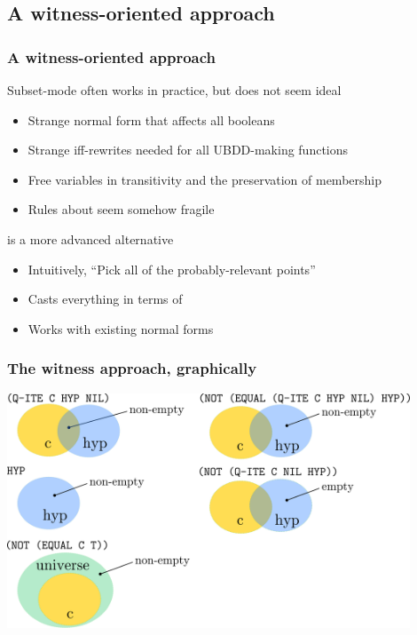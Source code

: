 
\subsection{A witness-oriented approach}


\begin{frame}[fragile]
\frametitle{A witness-oriented approach}

Subset-mode often works in practice, but does not seem ideal
\begin{itemize}
\item Strange normal form that affects all booleans
\item Strange iff-rewrites needed for all UBDD-making functions
\item Free variables in transitivity and the preservation of membership
\item Rules about  seem somehow fragile
\end{itemize}

\SmallSkip
{} is a more advanced alternative
\begin{itemize}
\item Intuitively, ``Pick all of the probably-relevant points''
\item Casts everything in terms of 
\item Works with existing normal forms
\end{itemize}
\end{frame}




\begin{frame}[fragile]
\frametitle{The witness approach, graphically}

\includegraphics[width=12cm]{venn-diagrams}

\end{frame}


